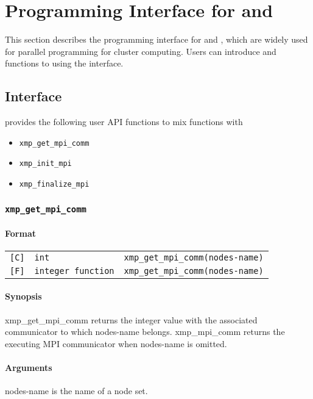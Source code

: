 \chapter{Programming Interface for {\MPI} and {\OMP}}

   This section describes the programming interface for {\MPI} and {\OMP},
   which are widely used for parallel programming for cluster computing.
   Users can introduce {\MPI} and {\OMP} functions to {\XMP} using the interface.   

\section{{\MPI} Interface}

   {\XMP} provides the following user API functions to mix {\MPI} functions with {\XMP}

\begin{itemize}
\item {\tt xmp\_get\_mpi\_comm}
\item {\tt xmp\_init\_mpi}
\item {\tt xmp\_finalize\_mpi}
\end{itemize}

\subsection{\tt xmp\_get\_mpi\_comm}

\subsubsection*{Format}

\begin{tabular}{lll}

\verb![C]!&  {\tt int}& {\tt xmp\_get\_mpi\_comm(nodes-name)}\\

\verb![F]!&  {\tt integer function}& {\tt xmp\_get\_mpi\_comm(nodes-name)}
\end{tabular}

\subsubsection*{Synopsis}
   xmp\_get\_mpi\_comm returns the integer value with the associated communicator to which
   nodes-name belongs. xmp\_mpi\_comm returns the executing MPI communicator when nodes-name is omitted.

\subsubsection*{Arguments}
   nodes-name is the name of a node set.

